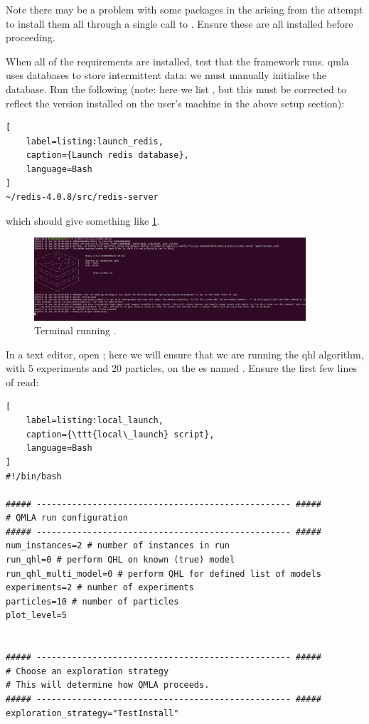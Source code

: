 Note there may be a problem with some packages in the  arising from the attempt to install them all through
a single call to . 
Ensure these are all installed before proceeding. 
\par 

When all of the requirements are installed, test that the framework runs. 
\gls{qmla} uses  databases to store intermittent data:
    we must manually initialise the database. 
Run the following 
    (note: here we list , but this must be corrected to reflect the 
    version installed on the user's machine in the above setup section):
\begin{lstlisting}[
    label=listing:launch_redis,
    caption={Launch redis database},
    language=Bash
]
~/redis-4.0.8/src/redis-server
\end{lstlisting}

which should give something like \cref{fig:terminal_redis}.
\begin{figure}[h!]
    \begin{center}
        \includegraphics[width=0.9\textwidth]{appendix/figures/terminal_redis.png}
    \end{center}
    \caption[Terminal running redis-server]{Terminal running .}
    \label{fig:terminal_redis}
\end{figure}
\par 

In a text editor, open ; 
    here we will ensure that we are running the \gls{qhl} algorithm, 
    with 5 experiments and 20 particles, on the \gls{es} named .
Ensure the first few lines of  read:

\begin{lstlisting}[
    label=listing:local_launch,
    caption={\ttt{local\_launch} script},
    language=Bash
]
#!/bin/bash

##### -------------------------------------------------- #####
# QMLA run configuration
##### -------------------------------------------------- #####
num_instances=2 # number of instances in run
run_qhl=0 # perform QHL on known (true) model
run_qhl_multi_model=0 # perform QHL for defined list of models
experiments=2 # number of experiments
particles=10 # number of particles
plot_level=5


##### -------------------------------------------------- #####
# Choose an exploration strategy 
# This will determine how QMLA proceeds. 
##### -------------------------------------------------- #####
exploration_strategy="TestInstall"
\end{lstlisting}    


